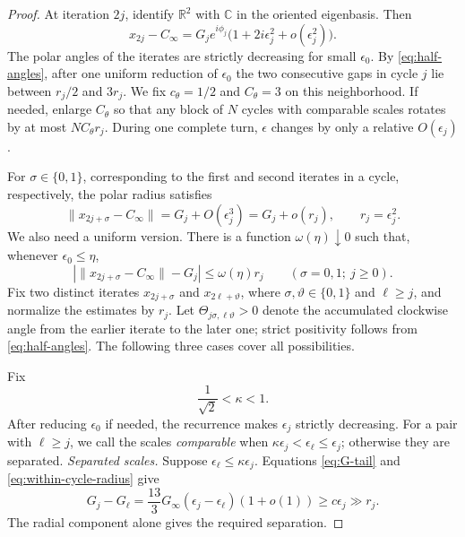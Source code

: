 \documentclass[11pt]{article}
\newcommand{\R}{\mathbb R}
\newcommand{\norm}[1]{\lVert #1\rVert}
\begin{document}
\begin{proof}
At iteration $2j$, identify $\R^2$ with $\mathbb C$ in the oriented
eigenbasis.  Then
\begin{equation}\label{eq:polar-boundary}
x_{2j}-C_\infty
=G_je^{i\phi_j}\bigl(1+2i\epsilon_j^2+o(\epsilon_j^2)\bigr).
\end{equation}
The polar angles of the iterates are strictly decreasing for small
$\epsilon_0$.  By \eqref{eq:half-angles}, after one uniform reduction of
$\epsilon_0$ the two
consecutive gaps in cycle $j$ lie between $r_j/2$ and $3r_j$.  We fix
$c_\theta=1/2$ and $C_\theta=3$ on this neighborhood.
If needed, enlarge $C_\theta$ so that any block of $N$ cycles with comparable
scales rotates by at most $NC_\theta r_j$.  During one
complete turn, $\epsilon$ changes by only a relative $O(\epsilon_j)$.

For $\sigma\in\{0,1\}$, corresponding to the first and second iterates in a
cycle, respectively, the polar radius satisfies
\begin{equation}\label{eq:within-cycle-radius}
\|x_{2j+\sigma}-C_\infty\|
=G_j+O(\epsilon_j^3)=G_j+o(r_j),
\qquad r_j=\epsilon_j^2.
\end{equation}
We also need a uniform version.  There is a function
$\omega(\eta)\downarrow0$ such that,
whenever $\epsilon_0\le\eta$,
\begin{equation}\label{eq:within-cycle-radius-uniform}
\left|\norm{x_{2j+\sigma}-C_\infty}-G_j\right|
\le \omega(\eta)r_j
\qquad(\sigma=0,1;\ j\ge0).
\end{equation}
Fix two distinct iterates $x_{2j+\sigma}$ and $x_{2\ell+\vartheta}$, where
$\sigma,\vartheta\in\{0,1\}$ and $\ell\ge j$, and normalize the estimates by
$r_j$.  Let $\Theta_{j\sigma,\ell\vartheta}>0$ denote the accumulated
clockwise angle from the earlier iterate to the later one; strict positivity
follows from \eqref{eq:half-angles}.  The following three cases cover all
possibilities.

Fix
\begin{equation}\label{eq:kappa-choice}
\frac1{\sqrt2}<\kappa<1.
\end{equation}
After reducing $\epsilon_0$ if needed, the recurrence makes $\epsilon_j$
strictly decreasing.  For a pair with $\ell\ge j$, we call
the scales \emph{comparable} when
$\kappa\epsilon_j<\epsilon_\ell\le\epsilon_j$; otherwise they are separated.
\emph{Separated scales.}  Suppose
$\epsilon_\ell\le\kappa\epsilon_j$.
Equations \eqref{eq:G-tail} and
\eqref{eq:within-cycle-radius} give
\[
G_j-G_\ell
=\frac{13}{3}G_\infty(\epsilon_j-\epsilon_\ell)(1+o(1))
\ge c\epsilon_j\gg r_j.
\]
The radial component alone gives the required separation.


\end{proof}
\end{document}

